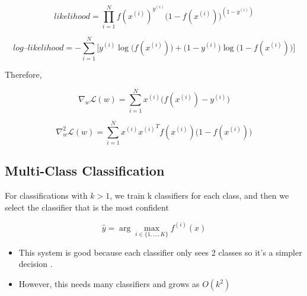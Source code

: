 \documentclass[11pt]{article}
\begin{document}
\[
likelihood = \prod_{i=1}^N f(x^{(i)})^{y^{(i)}} \big(1 - f(x^{(i)})\big)^{(1 - y^{(i)})}
\]

\[
log\text{--}likelihood = - \sum_{i=1}^N \Big[ y^{(i)} \log \big(f(x^{(i)})\big) 
+ \big(1 - y^{(i)}\big) \log \big(1 - f(x^{(i)})\big) \Big]
\]

Therefore,

\[
\nabla_w \mathcal{L}(w) = \sum_{i=1}^N x^{(i)} \Big(f(x^{(i)}) - y^{(i)}\Big)
\]

\[
\nabla_w^2 \mathcal{L}(w) = \sum_{i=1}^N x^{(i)} {x^{(i)}}^T f(x^{(i)}) \Big(1 - f(x^{(i)})\Big)
\]

\subsection*{Multi-Class Classification}
For classifications with $k > 1$, we train k classifiers for each class, and then we select the classifier that is the most confident

\[
\hat{y} = \arg\max_{i \in \{1, \dots, K\}} f^{(i)}(x)
\]

\begin{itemize}
	\item This system is good because each classifier only sees 2 classes so it's a 		simpler decision .
	\item However, this needs many classifiers and grows as $O(k^2)$
\end{itemize}
\end{document}

